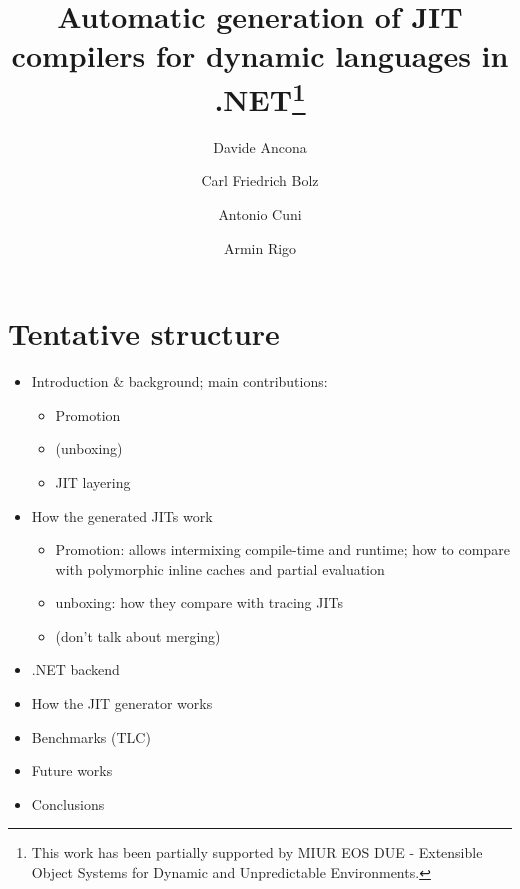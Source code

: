 \documentclass{llncs}
\begin{document}
\title{Automatic generation of JIT compilers for dynamic languages
  in .NET\thanks{This work has been partially
supported by MIUR EOS DUE - Extensible Object Systems for Dynamic and
Unpredictable Environments.}}


\author{Davide Ancona \and Carl Friedrich Bolz \and Antonio Cuni \and Armin Rigo}


\maketitle

\section{Tentative structure}
\begin{itemize}
  \item Introduction \& background; main contributions:
    \begin{itemize}
      \item Promotion
      \item (unboxing)
      \item JIT layering
    \end{itemize}
  \item How the generated JITs work
    \begin{itemize}
      \item Promotion: allows intermixing compile-time and runtime; how to
        compare with polymorphic inline caches and partial evaluation
      \item unboxing: how they compare with tracing JITs
      \item (don't talk about merging)
    \end{itemize}
  \item .NET backend
  \item How the JIT generator works
  \item Benchmarks (TLC)
  \item Future works
  \item Conclusions
\end{itemize}
    









%



\end{document}
